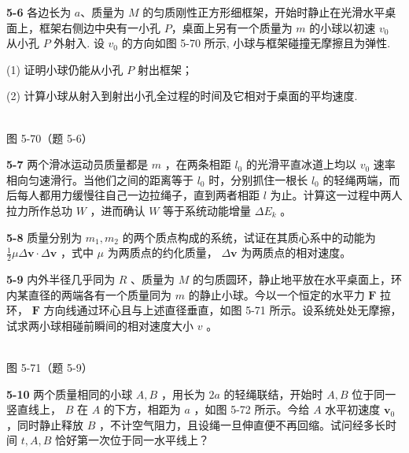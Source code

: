 \newpage

\textbf{5-6} 各边长为 $a$、质量为 $M$ 的匀质刚性正方形细框架，开始时静止在光滑水平桌面上，框架右侧边中央有一小孔 $P$，桌面上另有一个质量为 $m$ 的小球以初速 $v_{0}$ 从小孔 $P$ 外射入. 设 $v_{0}$ 的方向如图 5-70 所示, 小球与框架碰撞无摩擦且为弹性.

(1) 证明小球仍能从小孔 $P$ 射出框架；

(2) 计算小球从射入到射出小孔全过程的时间及它相对于桌面的平均速度.

\begin{center}
\resizebox{0.41\textwidth}{!}{}\\[4pt]
{\small 图 5-70（题 5-6）}
\end{center}

\newpage

\textbf{5-7} 两个滑冰运动员质量都是 $m$ ，在两条相距 $l_0$ 的光滑平直冰道上均以 $v_0$ 速率相向匀速滑行。当他们之间的距离等于 $l_0$ 时，分别抓住一根长 $l_0$ 的轻绳两端，而后每人都用力缓慢往自己一边拉绳子，直到两者相距 $l$ 为止。计算这一过程中两人拉力所作总功 $W$ ，进而确认 $W$ 等于系统动能增量 $\Delta E_k$ 。

\newpage

\textbf{5-8} 质量分别为 $m_{1}, m_{2}$ 的两个质点构成的系统，试证在其质心系中的动能为 $\frac{1}{2} \mu \Delta\boldsymbol v \cdot \Delta\boldsymbol v$ ，式中 $\mu$ 为两质点的约化质量， $\Delta\boldsymbol v$ 为两质点的相对速度。

\newpage

\textbf{5-9} 内外半径几乎同为 $R$ 、质量为 $M$ 的匀质圆环，静止地平放在水平桌面上，环内某直径的两端各有一个质量同为 $m$ 的静止小球。今以一个恒定的水平力 $\pmb{F}$ 拉环， $\pmb{F}$ 方向线通过环心且与上述直径垂直，如图 5-71 所示。设系统处处无摩擦，试求两小球相碰前瞬间的相对速度大小 $v$ 。

\begin{center}
\resizebox{0.50\textwidth}{!}{}\\[4pt]
{\small 图 5-71（题 5-9）}
\end{center}

\newpage

\textbf{5-10} 两个质量相同的小球 $A, B$ ，用长为 $2a$ 的轻绳联结，开始时 $A, B$ 位于同一竖直线上， $B$ 在 $A$ 的下方，相距为 $a$ ，如图 5-72 所示。今给 $A$ 水平初速度 $\pmb{v}_0$ ，同时静止释放 $B$ ，不计空气阻力，且设绳一旦伸直便不再回缩。试问经多长时间 $t, A, B$ 恰好第一次位于同一水平线上？

